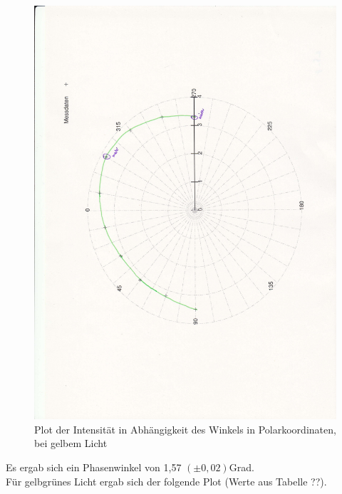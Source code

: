 \documentclass[12pt]{scrartcl}
\begin{document}
\begin{figure}[H]
\centering
    \includegraphics[scale = 0.3, angle = -90]{a_5_g.pdf}
  	\caption[Plot der Intensität in Abhängigkeit des Winkels in Polarkoordinaten, bei gelbem Licht]{Plot der Intensität in Abhängigkeit des Winkels in Polarkoordinaten, bei gelbem Licht}
  \label{fig:a_5_g}
\end{figure}


Es ergab sich ein Phasenwinkel von 1,57 $(\pm 0,02)$Grad.\\


Für gelbgrünes Licht ergab sich der folgende Plot (Werte aus Tabelle ??).
\end{document}
